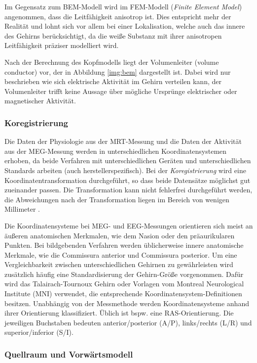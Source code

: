 \documentclass[doc,a4paper,12pt]{apa6}
\begin{document}
Im Gegensatz zum BEM-Modell wird im FEM-Modell (\emph{Finite Element Model}) angenommen, dass die Leitfähigkeit anisotrop ist. Dies entspricht mehr der Realität und lohnt sich vor allem bei einer Lokalisation, welche auch das innere des Gehirns berücksichtigt, da die weiße Substanz mit ihrer anisotropen Leitfähigkeit präziser modelliert wird.

Nach der Berechnung des Kopfmodells liegt der Volumenleiter (volume conductor) vor, der in Abbildung \ref{img:bem} dargestellt ist. Dabei wird nur beschrieben wie sich elektrische Aktivität im Gehirn verteilen kann, der Volumenleiter trifft keine Aussage über mögliche Ursprünge elektrischer oder magnetischer Aktivität.

\subsubsection{Koregistrierung}
\label{sec:coreg}

Die Daten der Physiologie aus der MRT-Messung und die Daten der Aktivität aus der MEG-Messung werden in unterschiedlichen Koordinatensystemen erhoben, da beide Verfahren mit unterschiedlichen Geräten und unterschiedlichen Standards arbeiten (auch herstellerspezifisch). Bei der \emph{Koregistrierung} wird eine Koordinatentransformation durchgeführt, so dass beide Datensätze möglichst gut zueinander passen. Die Transformation kann nicht fehlerfrei durchgeführt werden, die Abweichungen nach der Transformation liegen im Bereich von wenigen Millimeter \parencite{adjamian2004co,poghosyan2007precise}.

Die Koordinatensysteme bei MEG- und EEG-Messungen orientieren sich meist an äußeren anatomischen Merkmalen, wie dem Nasion oder den präaurikularen  Punkten. Bei bildgebenden Verfahren werden üblicherweise innere anatomische Merkmale, wie die Commissura anterior und Commissura posterior. Um eine Vergleichbarkeit zwischen unterschiedlichen Gehirnen zu gewährleisten wird zusätzlich häufig eine Standardisierung der Gehirn-Größe vorgenommen. Dafür wird das Talairach-Tournoux Gehirn oder Vorlagen vom Montreal Neurological Institute (MNI) verwendet, die entsprechende Koordinatensystem-Definitionen besitzen. Unabhängig von der Messmethode werden Koordinatensysteme anhand ihrer Orientierung klassifiziert. Üblich ist bspw. eine RAS-Orientierung. Die jeweiligen Buchstaben bedeuten anterior/posterior (A/P), links/rechts (L/R) und superior/inferior (S/I).

\subsubsection{Quellraum und Vorwärtsmodell}
\label{sec:lead}
\end{document}
